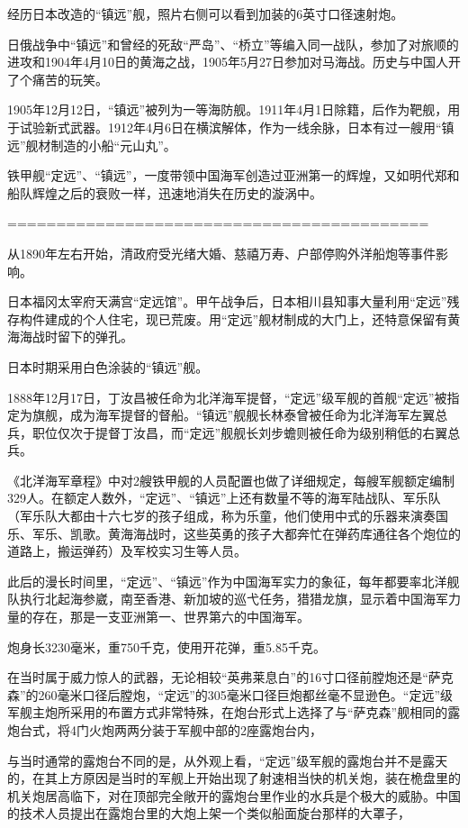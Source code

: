 \documentclass[12pt,UTF8]{ctexbook}
\begin{document}
经历日本改造的“镇远”舰，照片右侧可以看到加装的6英寸口径速射炮。

日俄战争中“镇远”和曾经的死敌“严岛”、“桥立”等编入同一战队，参加了对旅顺的进攻和1904年4月10日的黄海之战，1905年5月27日参加对马海战。历史与中国人开了个痛苦的玩笑。

1905年12月12日，“镇远”被列为一等海防舰。1911年4月1日除籍，后作为靶舰，用于试验新式武器。1912年4月6日在横滨解体，作为一线余脉，日本有过一艘用“镇远”舰材制造的小船“元山丸”。

铁甲舰“定远”、“镇远”，一度带领中国海军创造过亚洲第一的辉煌，又如明代郑和船队辉煌之后的衰败一样，迅速地消失在历史的漩涡中。

===========================================

从1890年左右开始，清政府受光绪大婚、慈禧万寿、户部停购外洋船炮等事件影响。

日本福冈太宰府天满宫“定远馆”。甲午战争后，日本相川县知事大量利用“定远”残存构件建成的个人住宅，现已荒废。用“定远”舰材制成的大门上，还特意保留有黄海海战时留下的弹孔。

日本时期采用白色涂装的“镇远”舰。

1888年12月17日，丁汝昌被任命为北洋海军提督，“定远”级军舰的首舰“定远”被指定为旗舰，成为海军提督的督船。“镇远”舰舰长林泰曾被任命为北洋海军左翼总兵，职位仅次于提督丁汝昌，而“定远”舰舰长刘步蟾则被任命为级别稍低的右翼总兵。

《北洋海军章程》中对2艘铁甲舰的人员配置也做了详细规定，每艘军舰额定编制329人。在额定人数外，“定远”、“镇远”上还有数量不等的海军陆战队、军乐队（军乐队大都由十六七岁的孩子组成，称为乐童，他们使用中式的乐器来演奏国乐、军乐、凯歌。黄海海战时，这些英勇的孩子大都奔忙在弹药库通往各个炮位的道路上，搬运弹药）及军校实习生等人员。

此后的漫长时间里，“定远”、“镇远”作为中国海军实力的象征，每年都要率北洋舰队执行北起海参崴，南至香港、新加坡的巡弋任务，猎猎龙旗，显示着中国海军力量的存在，那是一支亚洲第一、世界第六的中国海军。


炮身长3230毫米，重750千克，使用开花弹，重5.85千克。

在当时属于威力惊人的武器，无论相较“英弗莱息白”的16寸口径前膛炮还是“萨克森”的260毫米口径后膛炮，“定远”的305毫米口径巨炮都丝毫不显逊色。“定远”级军舰主炮所采用的布置方式非常特殊，在炮台形式上选择了与“萨克森”舰相同的露炮台式，将4门火炮两两分装于军舰中部的2座露炮台内，

与当时通常的露炮台不同的是，从外观上看，“定远”级军舰的露炮台并不是露天的，在其上方原因是当时的军舰上开始出现了射速相当快的机关炮，装在桅盘里的机关炮居高临下，对在顶部完全敞开的露炮台里作业的水兵是个极大的威胁。中国的技术人员提出在露炮台里的大炮上架一个类似船面旋台那样的大罩子，
\end{document}
